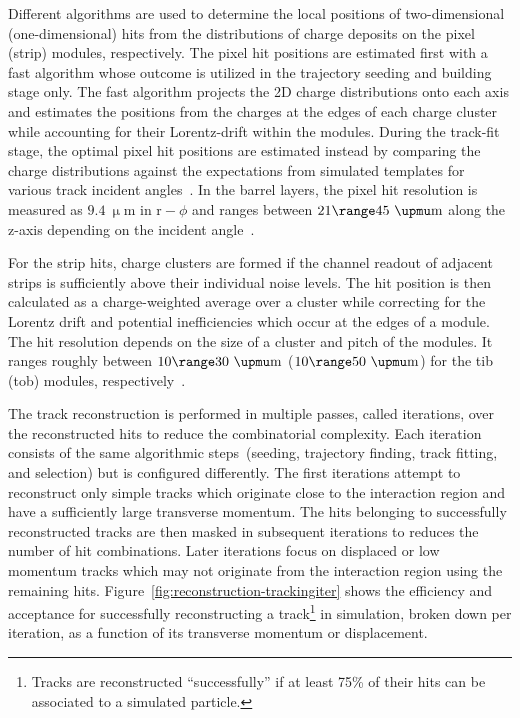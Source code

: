 Different algorithms are used to determine the local positions of two-dimensional (one-dimensional) hits from the distributions of charge deposits on the pixel (strip) modules, respectively. The pixel hit positions are estimated first with a fast algorithm whose outcome is utilized in the trajectory seeding and building stage only. The fast algorithm projects the 2D charge distributions onto each axis and estimates the positions from the charges at the edges of each charge cluster while accounting for their Lorentz-drift within the modules. During the track-fit stage, the optimal pixel hit positions are estimated instead by comparing the charge distributions against the expectations from simulated templates for various track incident angles~\cite{Swartz:2007zz}. In the barrel layers, the pixel hit resolution is measured as $9.4~\upmu\mathrm{m}$ in $\mathrm{r}-\phi$ and ranges between $21\range45~\upmu\mathrm{m}$ along the z-axis depending on the incident angle~\cite{Chatrchyan:2014fea}. 

For the strip hits, charge clusters are formed if the channel readout of adjacent strips is sufficiently above their individual noise levels. The hit position is then calculated as a charge-weighted average over a cluster while correcting for the Lorentz drift and potential inefficiencies which occur at the edges of a module. The hit resolution depends on the size of a cluster and pitch of the modules. It ranges roughly between $10\range30~\upmu\mathrm{m}$ ($10\range50~\upmu\mathrm{m}$) for the \gls{tib} (\gls{tob}) modules, respectively~\cite{Chatrchyan:2014fea}.

The track reconstruction is performed in multiple passes, called iterations, over the reconstructed hits to reduce the combinatorial complexity. Each iteration consists of the same algorithmic steps~(seeding, trajectory finding, track fitting, and selection) but is configured differently. The first iterations attempt to reconstruct only simple tracks which originate close to the interaction region and have a sufficiently large transverse momentum. The hits belonging to successfully reconstructed tracks are then masked in subsequent iterations to reduces the number of hit combinations. Later iterations focus on displaced or low momentum tracks which may not originate from the interaction region using the remaining hits. Figure~\ref{fig:reconstruction-trackingiter} shows the efficiency and acceptance for successfully reconstructing a track\footnote{Tracks are reconstructed ``successfully'' if at least 75\% of their hits can be associated to a simulated particle.} in simulation, broken down per iteration, as a function of its transverse momentum or displacement.


